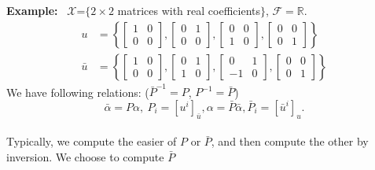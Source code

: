 \documentclass[letterpaper]{article}
\begin{document}
\noindent \textbf{Example:}~ $\mathcal{X}$=$\{2\times2$ matrices with real coefficients$\}$, $\mathcal{F}=\mathbb{R}$.
    \begin{align*}
        u&=\left\{ \left[\begin{array}{cc}
            1 & 0\\
            0 & 0
            \end{array}\right],\left[\begin{array}{cc}
            0 & 1\\
            0 & 0
            \end{array}\right],\left[\begin{array}{cc}
            0 & 0\\
            1 & 0
            \end{array}\right],\left[\begin{array}{cc}
            0 & 0\\
            0 & 1
            \end{array}\right]\right\}\\
        \bar{u}&=\left\{ \left[\begin{array}{cc}
            1 & 0\\
            0 & 0
            \end{array}\right],\left[\begin{array}{cc}
            0 & 1\\
            1 & 0
            \end{array}\right],\left[\begin{array}{cc}
            0 & 1\\
            -1 & 0
            \end{array}\right],\left[\begin{array}{cc}
            0 & 0\\
            0 & 1
        \end{array}\right]\right\}
    \end{align*}
    We have following relations: ($\bar{P}^{-1}=P$, $P^{-1}=\bar{P}$)\\          
    $$\bar{\alpha}={P}\alpha, ~P_i=[u^i]_{\bar{u}}, \alpha=\bar{P}\bar{\alpha}, \bar{P}_i=[\bar{u}^i]_u.$$  \\
    Typically, we compute the easier of $P$ or $\bar{P}$, and then compute the other by inversion.
    We choose to compute $\bar{P}$
\end{document}
